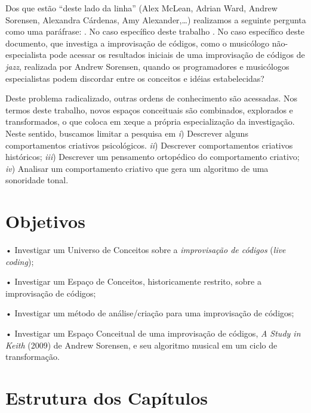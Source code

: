 Dos que estão ``deste lado da linha'' (Alex McLean, Adrian Ward, Andrew Sorensen, Alexandra Cárdenas, Amy Alexander,\ldots) realizamos a seguinte pergunta como uma paráfrase: \cite{pressing_improvisation_1987}. No caso específico deste trabalho \cite{pressing_cognitive_1984}. No caso específico deste documento, que investiga a improvisação de códigos, como o musicólogo não-especialista pode acessar os resultados iniciais de uma improvisação de códigos de \emph{jazz}, realizada por Andrew Sorensen, quando os programadores e musicólogos especialistas podem discordar entre os conceitos e idéias estabelecidas? 

Deste problema radicalizado, outras ordens de conhecimento são acessadas. Nos termos deste trabalho, novos espaços conceituais são combinados, explorados e transformados, o que coloca em xeque a própria especialização da investigação. Neste sentido, buscamos limitar a pesquisa em \emph{i}) Descrever alguns comportamentos criativos psicológicos. \emph{ii}) Descrever comportamentos criativos históricos; \emph{iii}) Descrever um pensamento ortopédico do comportamento criativo; \emph{iv}) Analisar um comportamento criativo que gera um algoritmo de uma sonoridade tonal. 

\section*{Objetivos}\label{sec:objetivos}

• Investigar um Universo de Conceitos sobre a \emph{improvisação de códigos} (\emph{live coding});

• Investigar um Espaço de Conceitos, historicamente restrito, sobre a improvisação de códigos;

• Investigar um método de análise/criação para uma improvisação de códigos;

• Investigar um Espaço Conceitual de uma improvisação de códigos, \emph{A Study in Keith} (2009) de Andrew Sorensen, e seu algoritmo musical em um ciclo de transformação.

\section*{Estrutura dos Capítulos}

